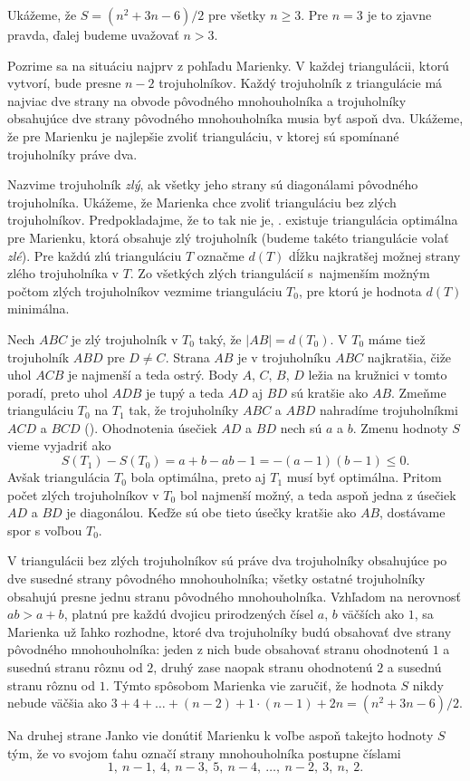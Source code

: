 {%
Ukážeme, že $S = (n^2+3n-6)/2$ pre všetky $n\ge 3$. Pre $n = 3$ je to zjavne pravda, ďalej budeme uvažovať $n > 3$.

Pozrime sa na situáciu najprv z pohľadu Marienky. V každej triangulácii, ktorú vytvorí, bude presne $n-2$ trojuholníkov.
Každý trojuholník z triangulácie má najviac dve strany na obvode pôvodného mnohouholníka a trojuholníky obsahujúce dve strany pôvodného mnohouholníka musia byť aspoň dva.
Ukážeme, že pre Marienku je najlepšie zvoliť trianguláciu, v ktorej sú spomínané trojuholníky práve dva.

Nazvime trojuholník {\it zlý}, ak všetky jeho strany sú diagonálami pôvodného trojuholníka. Ukážeme, že Marienka chce zvoliť trianguláciu bez zlých trojuholníkov.
Predpokladajme, že to tak nie je, \tj. existuje triangulácia optimálna pre Marienku, ktorá obsahuje zlý trojuholník (budeme takéto triangulácie volať {\it zlé\/}).
Pre každú zlú trianguláciu $T$ označme $d(T)$ dĺžku najkratšej možnej strany zlého trojuholníka v $T$. Zo všetkých zlých triangulácií s~najmenším možným počtom zlých trojuholníkov vezmime trianguláciu $T_0$, pre ktorú je hodnota $d(T)$ minimálna.
%

Nech $ABC$ je zlý trojuholník v $T_0$ taký, že $|AB| = d(T_0)$. V $T_0$ máme tiež trojuholník $ABD$ pre $D\ne C$. Strana $AB$ je v trojuholníku $ABC$ najkratšia, čiže uhol $ACB$ je najmenší a teda ostrý. Body $A$, $C$, $B$, $D$ ležia na kružnici v tomto poradí, preto uhol $ADB$ je tupý a teda $AD$ aj $BD$ sú kratšie ako $AB$. Zmeňme trianguláciu $T_0$ na $T_1$ tak, že trojuholníky $ABC$ a $ABD$ nahradíme trojuholníkmi $ACD$ a $BCD$ (\obr). Ohodnotenia úsečiek $AD$ a $BD$ nech sú $a$ a $b$. Zmenu hodnoty $S$ vieme vyjadriť ako
$$
S(T_1)-S(T_0) = a+b-ab-1 = -(a-1)(b-1)\le 0.
$$
Avšak triangulácia $T_0$ bola optimálna, preto aj $T_1$ musí byť optimálna. Pritom počet zlých trojuholníkov v $T_0$ bol najmenší možný, a teda aspoň jedna z úsečiek $AD$ a $BD$ je diagonálou. Keďže sú obe tieto úsečky kratšie ako $AB$, dostávame spor s voľbou $T_0$.

V triangulácii bez zlých trojuholníkov sú práve dva trojuholníky obsahujúce po dve susedné strany pôvodného mnohouholníka; všetky ostatné trojuholníky obsahujú presne jednu stranu pôvodného mnohouholníka. Vzhľadom na nerovnosť $ab > a+b$, platnú pre každú dvojicu prirodzených čísel $a$, $b$ väčších ako $1$, sa Marienka už ľahko rozhodne, ktoré dva trojuholníky budú obsahovať dve strany pôvodného mnohouholníka: jeden z nich bude obsahovať stranu ohodnotenú $1$ a susednú stranu rôznu od $2$, druhý zase naopak stranu ohodnotenú $2$ a susednú stranu rôznu od $1$. Týmto spôsobom Marienka vie zaručiť, že hodnota $S$ nikdy nebude väčšia ako $3+4+\dots+(n-2) + 1\cdot (n-1) + 2n = (n^2+3n-6)/2$.

Na druhej strane Janko vie donútiť Marienku k voľbe aspoň takejto hodnoty $S$ tým, že vo svojom ťahu označí strany mnohouholníka postupne číslami
$$
1,\ n-1,\ 4,\ n-3,\ 5,\ n-4,\ \dots,\ n-2,\ 3,\ n,\ 2.
$$
}

